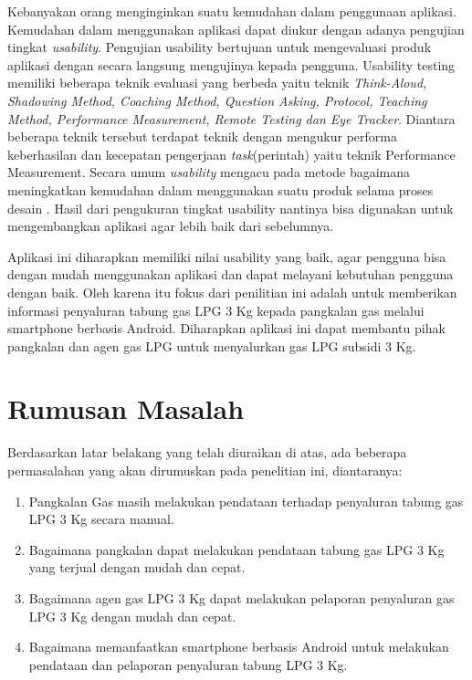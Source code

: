 \par Kebanyakan orang menginginkan suatu kemudahan dalam penggunaan aplikasi. Kemudahan dalam menggunakan aplikasi dapat diukur dengan adanya pengujian tingkat \textit{usability}. Pengujian usability bertujuan untuk mengevaluasi produk aplikasi dengan secara langsung mengujinya kepada pengguna. Usability testing memiliki beberapa teknik evaluasi yang berbeda yaitu teknik \textit{Think-Aloud, Shadowing Method, Coaching Method, Question Asking, Protocol, Teaching Method, Performance Measurement, Remote Testing dan Eye Tracker}. Diantara beberapa teknik tersebut terdapat teknik dengan mengukur performa keberhasilan dan kecepatan pengerjaan \textit{task}(perintah) yaitu teknik Performance Measurement. Secara umum \textit{usability} mengacu pada metode bagaimana meningkatkan kemudahan dalam menggunakan suatu produk selama proses desain \citep{nielsen2012}. Hasil dari pengukuran tingkat usability nantinya bisa digunakan untuk mengembangkan aplikasi agar lebih baik dari sebelumnya.
\par Aplikasi ini diharapkan memiliki nilai usability yang baik, agar pengguna bisa dengan mudah menggunakan aplikasi dan dapat melayani kebutuhan pengguna dengan baik. Oleh karena itu fokus dari penilitian ini adalah untuk memberikan informasi penyaluran tabung gas LPG 3 Kg kepada pangkalan gas melalui smartphone berbasis Android. Diharapkan aplikasi ini dapat membantu pihak pangkalan dan agen gas LPG untuk menyalurkan gas LPG subsidi 3 Kg.


\section{Rumusan Masalah}
Berdasarkan latar belakang yang telah diuraikan di atas, ada beberapa permasalahan yang akan dirumuskan pada penelitian ini, diantaranya:
\begin{enumerate}
	\item Pangkalan Gas masih melakukan pendataan terhadap penyaluran tabung gas LPG 3 Kg secara manual.
	\item Bagaimana pangkalan dapat melakukan pendataan tabung gas LPG 3 Kg yang terjual dengan mudah dan cepat.
	\item Bagaimana agen gas LPG 3 Kg dapat melakukan pelaporan penyaluran gas LPG 3 Kg dengan mudah dan cepat.
	\item Bagaimana memanfaatkan smartphone berbasis Android untuk melakukan pendataan dan pelaporan penyaluran tabung LPG 3 Kg.
\end{enumerate}

